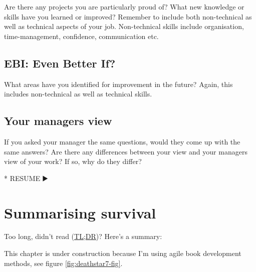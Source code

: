 \documentclass[
]{book}
\newenvironment{Shaded}{\begin{snugshade}}{\end{snugshade}}
\newcommand{\NormalTok}[1]{#1}
\newcommand{\SpecialStringTok}[1]{\textcolor[rgb]{0.31,0.60,0.02}{#1}}
\begin{document}
Are there any projects you are particularly proud of? What new knowledge or skills have you learned or improved? Remember to include both non-technical as well as technical aspects of your job. Non-technical skills include organisation, time-management, confidence, communication etc.

\hypertarget{ebi-even-better-if}{%
\subsection{EBI: Even Better If?}\label{ebi-even-better-if}}

What areas have you identified for improvement in the future? Again, this includes non-technical as well as technical skills.

\hypertarget{your-managers-view}{%
\subsection{Your managers view}\label{your-managers-view}}

If you asked your manager the same questions, would they come up with the same answers? Are there any differences between your view and your managers view of your work? If so, why do they differ?

\begin{Shaded}
\begin{Highlighting}[]
\SpecialStringTok{* }\NormalTok{RESUME ▶️}
\end{Highlighting}
\end{Shaded}

\hypertarget{tldr10}{%
\section{Summarising survival}\label{tldr10}}

Too long, didn't read (\href{https://en.wiktionary.org/wiki/too_long;_didn\%27t_read}{TL;DR})? Here's a summary:

This chapter is under construction because I'm using agile book development methods, see figure \ref{fig:deathstar7-fig}.
\end{document}
